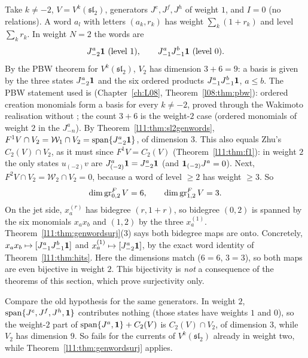\begin{example}\label{l11:ex:sl2weight2}
Take $k\neq-2$, $V = V^k(\mathfrak{sl}_2)$, generators $J^e,J^f,J^h$ of weight $1$, and $I = 0$ (no relations). A word
$a_l$ with letters $(a_k,r_k)$ has weight $\sum_k(1+r_k)$ and level $\sum_kr_k$. In weight $N=2$ the words are
\begin{equation*}
  J^a_{-2}\lelevenvac\ (\text{level }1),\qquad J^a_{-1}J^b_{-1}\lelevenvac\ (\text{level }0).
\end{equation*}
By the PBW theorem for $V^k(\mathfrak{sl}_2)$, $V_2$ has dimension $3+6 = 9$: a basis is given by the three states
$J^a_{-2}\mathbf{1}$ and the six ordered products $J^a_{-1}J^b_{-1}\mathbf{1}$, $a\le b$. The PBW statement used is
 (Chapter~\ref{ch:L08}, Theorem~\ref{l08:thm:pbw}): ordered creation monomials form a basis for
every $k\neq-2$, proved through the Wakimoto realisation without ; the count $3+6$ is the weight-$2$ case
(ordered monomials of weight $2$ in the $J^a_{-n}$). By Theorem~\ref{l11:thm:sl2genwords}, $F^1V\cap V_2 = \mathcal W_1\cap V_2 =
\operatorname{span}\{J^a_{-2}\mathbf{1}\}$, of dimension $3$. This also equals Zhu's $C_2(V)\cap V_2$, as it must since
$F^1V = C_2(V)$ (Theorem~\ref{l11:thm:f1}): in weight $2$ the only states $u_{(-2)}v$ are $J^a_{(-2)}\mathbf{1} = J^a_{-2}\mathbf{1}$
(and $\mathbf{1}_{(-2)}J^a = 0$). Next,
$F^2V\cap V_2 = \mathcal W_2\cap V_2 = 0$, because a word of level $\ge2$ has weight $\ge3$. So
\begin{equation*}
  \dim\operatorname{gr}^F_{0,2}V = 6,\qquad\dim\operatorname{gr}^F_{1,2}V = 3 .
\end{equation*}
On the jet side, $x_a^{(r)}$ has bidegree $(r,1+r)$, so bidegree $(0,2)$ is spanned by the six monomials $x_ax_b$ and $(1,2)$
by the three $x_a^{(1)}$. Theorem~\ref{l11:thm:genwordsurj}(3) says both bidegree maps are onto. Concretely,
$x_ax_b\mapsto[J^a_{-1}J^b_{-1}\mathbf{1}]$ and $x_a^{(1)}\mapsto[J^a_{-2}\mathbf{1}]$, by the exact word identity of
Theorem~\ref{l11:thm:hits}. Here the dimensions match ($6=6$, $3=3$), so both maps are even bijective in weight $2$. This
bijectivity is \emph{not} a consequence of the theorems of this section, which prove surjectivity only.

Compare the old hypothesis  for the same generators. In weight $2$,
$\operatorname{span}\{J^e,J^f,J^h,\mathbf{1}\}$ contributes nothing (those states have weights $1$ and $0$), so the weight-$2$
part of $\operatorname{span}\{J^a,\mathbf{1}\}+C_2(V)$ is $C_2(V)\cap V_2$, of dimension $3$, while $V_2$ has dimension $9$.
So  fails for the currents of $V^k(\mathfrak{sl}_2)$ already in weight two, while Theorem~\ref{l11:thm:genwordsurj}
applies.
\end{example}

